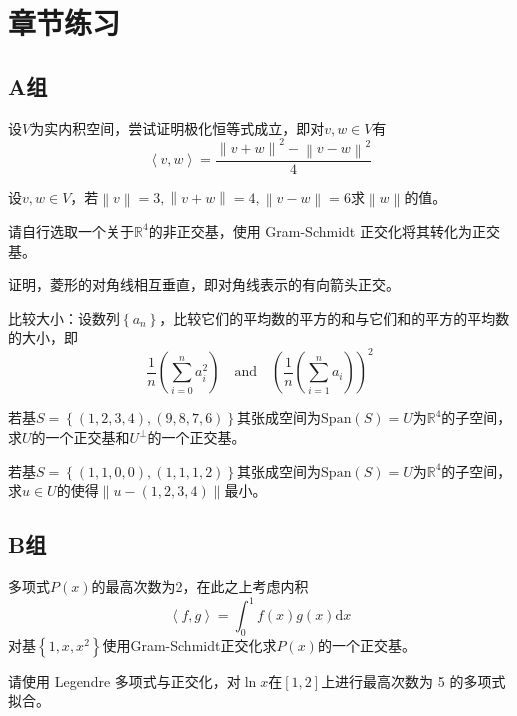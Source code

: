 \section{章节练习}

\subsection{A组}

\begin{reidai}
	设$V$为实内积空间，尝试证明极化恒等式成立，即对$v,w\in V$有$$\left \langle v,w \right \rangle =\frac{\left \| v+w \right \|^2-\left \| v-w \right \|^2  }{4}$$
\end{reidai}

\begin{reidai}
	设$v,w\in V$，若$\left \| v \right \| =3, \left \| v+w \right \| =4, \left \| v-w \right \| =6$求$\left \| w \right \| $的值。
\end{reidai}

\begin{reidai}
	请自行选取一个关于$\mathbb{R}^4$的非正交基，使用 Gram-Schmidt 正交化将其转化为正交基。
\end{reidai}

\begin{reidai}
	证明，菱形的对角线相互垂直，即对角线表示的有向箭头正交。
\end{reidai}

\begin{reidai}
	比较大小：设数列$\left\{ a_n \right\}$，比较它们的平均数的平方的和与它们和的平方的平均数的大小，即$$\frac{1}{n} \left ( \sum_{i=0}^{n}a_i^2  \right ) \quad \text{and} \quad \left ( \frac{1}{n} \left ( \sum_{i=1}^{n}a_i \right )  \right )  ^2$$
\end{reidai}

\begin{reidai}
	若基$S=\left\{ (1,2,3,4),(9,8,7,6) \right\}$其张成空间为$\text{Span}(S)=U$为$\mathbb{R}^4$的子空间，求$U$的一个正交基和$U^{\bot}$的一个正交基。
\end{reidai}

\begin{reidai}
	若基$S=\left\{ (1,1,0,0),(1,1,1,2) \right\}$其张成空间为$\text{Span}(S)=U$为$\mathbb{R}^4$的子空间，求$u\in U$的使得$\left \| u-(1,2,3,4) \right \| $最小。
\end{reidai}

\subsection{B组}

\begin{reidai}
	多项式$P(x)$的最高次数为2，在此之上考虑内积$$\left \langle f,g \right \rangle =\int_{0}^{1} f(x)g(x)\mathrm{d}x $$对基$\left\{ 1,x,x^2 \right\}$使用Gram-Schmidt正交化求$P(x)$的一个正交基。
\end{reidai}

\begin{reidai}
	请使用 Legendre 多项式与正交化，对$\ln x$在$\left [ 1,2 \right ] $上进行最高次数为 5 的多项式拟合。
\end{reidai}

